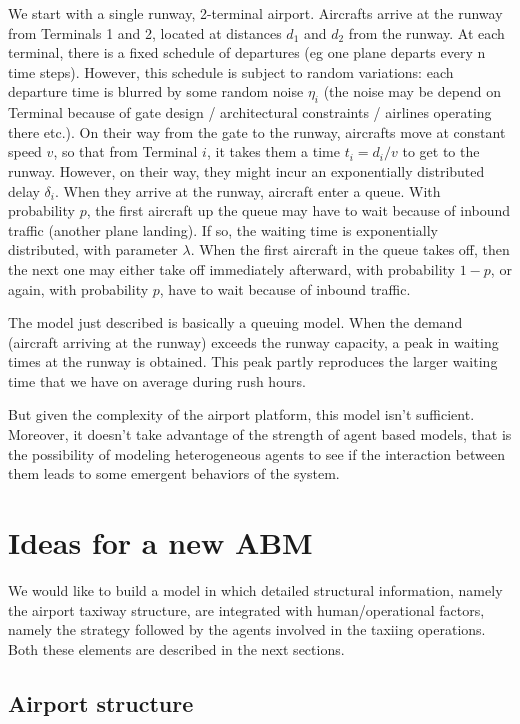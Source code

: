 \documentclass{article}
\begin{document}
We start with a single runway, 2-terminal airport. Aircrafts arrive at the runway from Terminals 1 and 2, located at distances $d_1$ and $d_2$ from the runway. At each terminal, there is a fixed schedule of departures (eg one plane departs every n time steps). However, this schedule is subject to random variations: each departure time is blurred by some random noise $\eta_i$ (the noise may be depend on Terminal because of gate design / architectural constraints / airlines operating there etc.). On their way from the gate to the runway, aircrafts move at constant speed $v$, so that from Terminal $i$, it takes them a time $t_i = d_i/v$ to get to the runway. However, on their way, they might incur an exponentially distributed delay $\delta_i$. When they arrive at the runway, aircraft enter a queue. With probability $p$, the first aircraft up the queue may have to wait because of inbound traffic (another plane landing). If so, the waiting time is exponentially distributed, with parameter $\lambda$. 
When the first aircraft in the queue takes off, then the next one may either take off immediately afterward, with probability $1-p$, or again, with probability $p$, have to wait because of inbound traffic. 
\smallskip

The model just described is basically a queuing model. When the demand (aircraft arriving at the runway) exceeds the runway capacity, a peak in waiting times at the runway is obtained. This peak partly reproduces the larger waiting time that we have on average during rush hours. 

But given the complexity of the airport platform, this model isn't sufficient. Moreover, it doesn't take advantage of the strength of agent based models, that is the possibility of modeling heterogeneous agents to see if the interaction between them leads to some emergent behaviors of the system.

\section{Ideas for a new ABM}
We would like to build a model in which detailed structural information, namely the airport taxiway structure, are integrated with human/operational factors, namely the strategy followed by the agents involved in the taxiing operations. Both these elements are described in the next sections.

\subsection{Airport structure}
\end{document}
